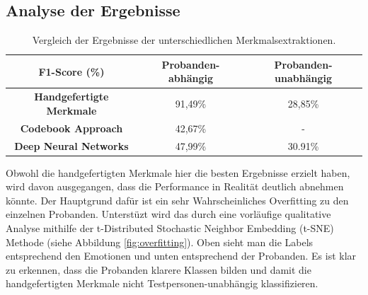 \subsection{Analyse der Ergebnisse} \label{analyse-subsec}


\begin{table}[H] \centering
\begin{tabular}{|c|c|c|}
\hline
\textbf{F1-Score (\%)} & \textbf{Probanden-abhängig} & \textbf{Probanden-unabhängig} \\ \hline
\textbf{Handgefertigte Merkmale} & 91,49\% & 28,85\% \\ \hline
\textbf{Codebook Approach} & 42,67\% & - \\ \hline
\textbf{Deep Neural Networks} & 47,99\% & 30.91\% \\ \hline
\end{tabular} \vspace{0.2cm} \label{tab-res-1} \caption{Vergleich der Ergebnisse der unterschiedlichen Merkmalsextraktionen.}
\end{table}





Obwohl die handgefertigten Merkmale hier die besten Ergebnisse erzielt haben, wird davon ausgegangen, dass die Performance in Realität deutlich abnehmen könnte.
Der Hauptgrund dafür ist ein sehr Wahrscheinliches Overfitting zu den einzelnen Probanden. 
Unterstüzt wird das durch eine vorläufige qualitative Analyse mithilfe der t-Distributed Stochastic Neighbor Embedding (t-SNE) Methode (siehe Abbildung \ref{fig:overfitting}). 
Oben sieht man die Labels entsprechend den Emotionen und unten entsprechend der Probanden.
Es ist klar zu erkennen, dass die Probanden klarere Klassen bilden und damit die handgefertigten Merkmale nicht Testpersonen-unabhängig klassifizieren. \\


